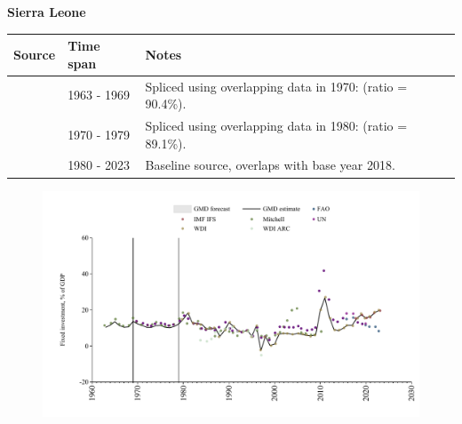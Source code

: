 \documentclass[12pt,a4paper,landscape]{article}
\begin{document}
\begin{adjustbox}{max totalsize={\paperwidth}{\paperheight},center}
\begin{minipage}[t][\textheight][t]{\textwidth}
\vspace*{0.5cm}
{}
\begin{center}
{\Large\bfseries Sierra Leone}
\end{center}
\vspace{0.5cm}
\begin{table}[H]
\centering
\small
\begin{tabular}{|l|l|l|}
\hline
\textbf{Source} & \textbf{Time span} & \textbf{Notes} \\
\hline
\rowcolor{white}\cite{Mitchell}& 1963 - 1969 &Spliced using overlapping data in 1970: (ratio = 90.4\%).\\
\rowcolor{lightgray}\cite{UN}& 1970 - 1979 &Spliced using overlapping data in 1980: (ratio = 89.1\%).\\
\rowcolor{white}\cite{WDI}& 1980 - 2023 &Baseline source, overlaps with base year 2018.\\
\hline
\end{tabular}
\end{table}
\begin{figure}[H]
\centering
\includegraphics[width=\textwidth,height=0.6\textheight,keepaspectratio]{graphs/SLE_finv_GDP.pdf}
\end{figure}
\end{minipage}
\end{adjustbox}
\end{document}
